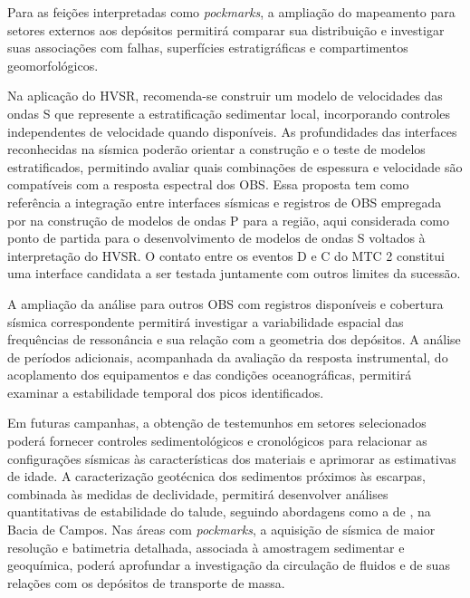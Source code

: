 Para as feições interpretadas como \textit{pockmarks}, a ampliação do mapeamento para setores externos aos depósitos permitirá comparar sua distribuição e investigar suas associações com falhas, superfícies estratigráficas e compartimentos geomorfológicos.

Na aplicação do HVSR, recomenda-se construir um modelo de velocidades das ondas S que represente a estratificação sedimentar local, incorporando controles independentes de velocidade quando disponíveis. As profundidades das interfaces reconhecidas na sísmica poderão orientar a construção e o teste de modelos estratificados, permitindo avaliar quais combinações de espessura e velocidade são compatíveis com a resposta espectral dos OBS. Essa proposta tem como referência a integração entre interfaces sísmicas e registros de OBS empregada por  na construção de modelos de ondas P para a região, aqui considerada como ponto de partida para o desenvolvimento de modelos de ondas S voltados à interpretação do HVSR. O contato entre os eventos D e C do MTC 2 constitui uma interface candidata a ser testada juntamente com outros limites da sucessão.

A ampliação da análise para outros OBS com registros disponíveis e cobertura sísmica correspondente permitirá investigar a variabilidade espacial das frequências de ressonância e sua relação com a geometria dos depósitos. A análise de períodos adicionais, acompanhada da avaliação da resposta instrumental, do acoplamento dos equipamentos e das condições oceanográficas, permitirá examinar a estabilidade temporal dos picos identificados.

Em futuras campanhas, a obtenção de testemunhos em setores selecionados poderá fornecer controles sedimentológicos e cronológicos para relacionar as configurações sísmicas às características dos materiais e aprimorar as estimativas de idade. A caracterização geotécnica dos sedimentos próximos às escarpas, combinada às medidas de declividade, permitirá desenvolver análises quantitativas de estabilidade do talude, seguindo abordagens como a de , na Bacia de Campos. Nas áreas com \textit{pockmarks}, a aquisição de sísmica de maior resolução e batimetria detalhada, associada à amostragem sedimentar e geoquímica, poderá aprofundar a investigação da circulação de fluidos e de suas relações com os depósitos de transporte de massa.
